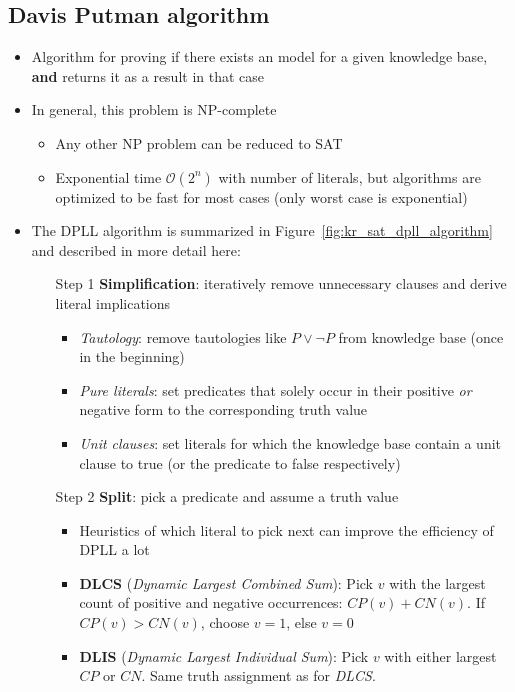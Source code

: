 \subsection{Davis Putman algorithm}
\begin{itemize}
	\item Algorithm for proving if there exists an model for a given knowledge base, \textbf{and} returns it as a result in that case
	\item In general, this problem is NP-complete
	\begin{itemize}
		\item Any other NP problem can be reduced to SAT
		\item Exponential time $\mathcal{O}(2^n)$ with number of literals, but algorithms are optimized to be fast for most cases (only worst case is exponential)
	\end{itemize}
	\item The DPLL algorithm is summarized in Figure~\ref{fig:kr_sat_dpll_algorithm} and described in more detail here:
	\begin{enumerate}
		\item[Step 1] \textbf{Simplification}: iteratively remove unnecessary clauses and derive literal implications
		\begin{itemize}
			\item \textit{Tautology}: remove tautologies like $P\vee \lnot P$ from knowledge base (once in the beginning)
			\item \textit{Pure literals}: set predicates that solely occur in their positive \textit{or} negative form to the corresponding truth value
			\item \textit{Unit clauses}: set literals for which the knowledge base contain a unit clause to true (or the predicate to false respectively)
		\end{itemize}
		\item[Step 2] \textbf{Split}: pick a predicate and assume a truth value
		\begin{itemize}
			\item Heuristics of which literal to pick next can improve the efficiency of DPLL a lot
			\item \textbf{DLCS} (\textit{Dynamic Largest Combined Sum}): Pick $v$ with the largest count of positive and negative occurrences: $CP(v) + CN(v)$. If $CP(v) > CN(v)$, choose $v=1$, else $v=0$
			\item \textbf{DLIS} (\textit{Dynamic Largest Individual Sum}): Pick $v$ with either largest $CP$ or $CN$. Same truth assignment as for \textit{DLCS}.

\end{itemize}
\end{enumerate}
\end{itemize}
